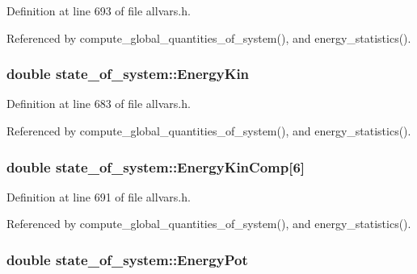 Definition at line 693 of file allvars.h.



Referenced by compute\_\-global\_\-quantities\_\-of\_\-system(), and energy\_\-statistics().

\hypertarget{structstate__of__system_a92ed1ad5f1a02586030b21f5f3e560ec}{
\subsubsection[{EnergyKin}]{\setlength{\rightskip}{0pt plus 5cm}double {\bf state\_\-of\_\-system::EnergyKin}}}
\label{structstate__of__system_a92ed1ad5f1a02586030b21f5f3e560ec}


Definition at line 683 of file allvars.h.



Referenced by compute\_\-global\_\-quantities\_\-of\_\-system(), and energy\_\-statistics().

\hypertarget{structstate__of__system_a8b776a503b441fc690c0940e3386a2fb}{
\subsubsection[{EnergyKinComp}]{\setlength{\rightskip}{0pt plus 5cm}double {\bf state\_\-of\_\-system::EnergyKinComp}\mbox{[}6\mbox{]}}}
\label{structstate__of__system_a8b776a503b441fc690c0940e3386a2fb}


Definition at line 691 of file allvars.h.



Referenced by compute\_\-global\_\-quantities\_\-of\_\-system(), and energy\_\-statistics().

\hypertarget{structstate__of__system_aece07698cdbe00520fcb92ad9f04d435}{
\subsubsection[{EnergyPot}]{\setlength{\rightskip}{0pt plus 5cm}double {\bf state\_\-of\_\-system::EnergyPot}}}
\label{structstate__of__system_aece07698cdbe00520fcb92ad9f04d435}


